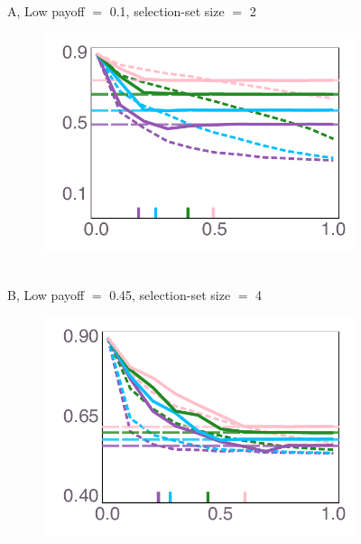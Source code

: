 \documentclass[letterpaper,11.5pt]{scrartcl}
\begin{document}
\clearpage
\begin{figure}
  \caption{Comparison of observed average payoffs in simulations with average payoffs
    obtained by populations homogeneously initialized to be all social or all asocial learners. Often the simulated payoffs follow the payoffs from the better-performing homogeneous group, with some exceptions discussed in the main text.}
  \label{fig:payoffs}
  \vspace{1em}
  \centering 
    {\textsf A, Low payoff $=$ 0.1, selection-set size $=$ 2} \\
    \begin{subfigure}[]{0.4\textwidth}
      \centering
      \includegraphics[width=\textwidth]{Figures/mean_prev_net_payoff_over_u_lowpayoff=0.1_nbehaviors=2.pdf}
    \end{subfigure} \\
    \centering
    {\textsf B, Low payoff $=$ 0.45, selection-set size $=$ 4} \\
    \begin{subfigure}[]{0.4\textwidth}
      \centering
      \includegraphics[width=\textwidth]{Figures/mean_prev_net_payoff_over_u_lowpayoff=0.45_nbehaviors=4.pdf}

\end{subfigure}
\end{figure}
\end{document}
